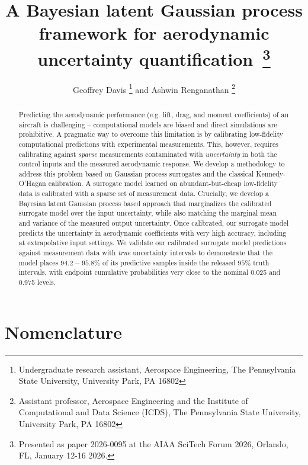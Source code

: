 \documentclass[journal]{new-aiaa}
\title{A Bayesian latent Gaussian process framework for aerodynamic uncertainty quantification~\footnote{Presented as paper 2026-0095 at the AIAA SciTech Forum 2026, Orlando, FL, January 12-16 2026.}}
\author{Geoffrey Davis \footnote{Undergraduate research assistant, Aerospace Engineering, The Pennsylvania State University, University Park, PA 16802} and Ashwin Renganathan \footnote{Assistant professor, Aerospace Engineering and the Institute of Computational and Data Science (ICDS), The Pennsylvania State University, University Park, PA 16802}}
\affil{The Pennsylvania State University, University Park, PA 16802}
\date{}
\begin{document}
\maketitle


\begin{abstract}
Predicting the aerodynamic performance (e.g. lift, drag, and moment coefficients) of an aircraft is challenging -- computational models are biased and direct simulations are prohibitive. A pragmatic way to overcome this limitation is by calibrating low-fidelity computational predictions with experimental measurements. This, however, requires calibrating against \emph{sparse} measurements contaminated with \emph{uncertainty} in both the control inputs and the measured aerodynamic response. We develop a methodology to address this problem based on Gaussian process surrogates and the classical Kennedy-O'Hagan calibration. A surrogate model learned on abundant-but-cheap low-fidelity data is calibrated with a sparse set of measurement data. Crucially, we develop a Bayesian latent Gaussian process based approach that marginalizes the calibrated surrogate model over the input uncertainty, while also matching the marginal mean and variance of the measured output uncertainty. Once calibrated, our surrogate model predicts the uncertainty in aerodynamic coefficients with very high accuracy, including at extrapolative input settings. We validate our calibrated surrogate model predictions against measurement data with \emph{true} uncertainty intervals to demonstrate that the model places $94.2-95.8\%$ of its predictive samples inside the released $95\%$ truth intervals, with endpoint cumulative probabilities very close to the nominal 0.025 and 0.975 levels.
\end{abstract}

\section*{Nomenclature}
\end{document}
